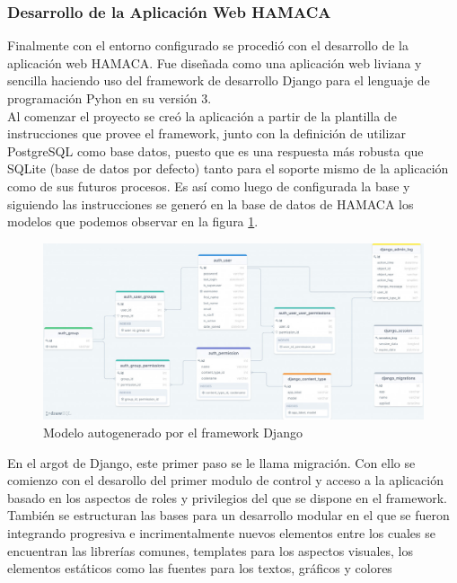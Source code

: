 \subsubsection{Desarrollo de la Aplicación Web HAMACA}
Finalmente con el entorno configurado se procedió con el desarrollo de la aplicación web HAMACA. Fue diseñada como una aplicación web liviana y sencilla haciendo uso del framework de desarrollo Django para el lenguaje de programación Pyhon en su versión 3.\\

Al comenzar el proyecto se creó la aplicación a partir de la plantilla de instrucciones que provee el framework, junto con la definición de utilizar PostgreSQL como base datos, puesto que es una respuesta más robusta que SQLite (base de datos por defecto) tanto para el soporte mismo de la aplicación como de sus futuros procesos. Es así como luego de configurada la base y siguiendo las instrucciones se generó en la base de datos de HAMACA los modelos que podemos observar en la figura \ref{fig:django_schema}.
\begin{figure}[!htb]
\centering
\includegraphics[scale=0.28]{./Figuras/django_schema.jpg}
\caption{Modelo autogenerado por el framework Django}
\label{fig:django_schema}
\vspace*{-10pt}
\end{figure}

En el argot de Django, este primer paso se le llama migración. Con ello se comienzo con el desarollo del primer modulo de control y acceso a la aplicación basado en los aspectos de roles y privilegios del que se dispone en el framework. También se estructuran las bases para un desarrollo modular en el que se fueron integrando progresiva e incrimentalmente nuevos elementos entre los cuales se encuentran las librerías comunes, templates para los aspectos visuales, los elementos estáticos como las fuentes para los textos, gráficos y colores\\

